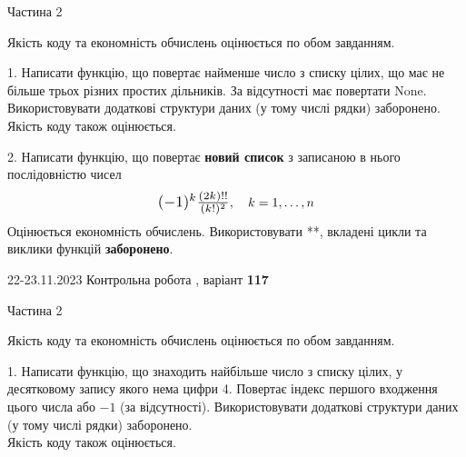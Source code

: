 \documentclass[12pt, ukrainian]{article}
\begin{document}
{{{{{{{{{{{{{{{\begin {Huge}
\begin{center}Частина 2
\end{center}
\vspace{10mm}
\end {Huge}

{
\begin {Large}
Якість коду та економність обчислень оцінюється по обом завданням.

\vspace{5mm}

1. Написати функцію, що повертає найменше число з списку цілих, що має не більше трьох різних простих дільників. За відсутності має повертати None. Використовувати додаткові структури даних (у тому числі рядки) заборонено.\\	Якість коду також оцінюється. 



\vspace{10mm}



2. 
Написати функцію, що повертає \textbf{новий список} з записаною в нього послідовністю чисел
$$\scalebox{1.2}{$(-1)^{k}\frac{(2k)!!}{(k!)^2}$}, \quad k=1,\ldots,n$$
Оцінюється економність обчислень. Використовувати **, вкладені цикли та виклики функцій \textbf{заборонено}.

\end{Large}\newpage




\begin {Huge}
{{22-23.11.2023 Контрольна робота , варіант  \No \textbf { 117 }\par}}

\begin{center}Частина 2
\end{center}
\vspace{10mm}
\end {Huge}

{
\begin {Large}
Якість коду та економність обчислень оцінюється по обом завданням.

\vspace{5mm}

1. Написати функцію, що знаходить найбільше число з списку цілих, у десятковому запису якого нема цифри 4. Повертає індекс першого входження цього числа або $-1$ (за відсутності). Використовувати додаткові структури даних (у тому числі рядки) заборонено.\\	Якість коду також оцінюється. 




\end{Large}}}}}}}}}}}}}}}}}}
\end{document}
